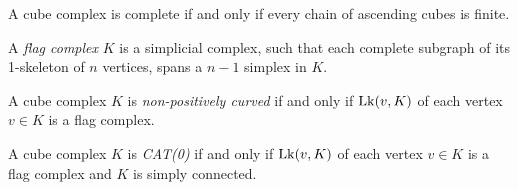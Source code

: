 


\begin{thm}
  A cube complex is complete if and only if every chain of ascending cubes is finite.
\end{thm}


\begin{defin}
  A \emph{flag complex} \(K\) is a simplicial complex, such that each complete subgraph of its 1-skeleton of \(n\) vertices, spans a \(n-1\) simplex in \(K\).
\end{defin}

\begin{thm}
  \label{thm:link}
  A cube complex \(K\) is \emph{non-positively curved} if and only if \(\operatorname{Lk}(v,K)\) of each vertex \(v \in K\) is a flag complex.

  A cube complex \(K\) is \emph{CAT(0)} if and only if \(\operatorname{Lk}(v,K)\) of each vertex \(v \in K\) is a flag complex and \(K\) is simply connected.
\end{thm}

